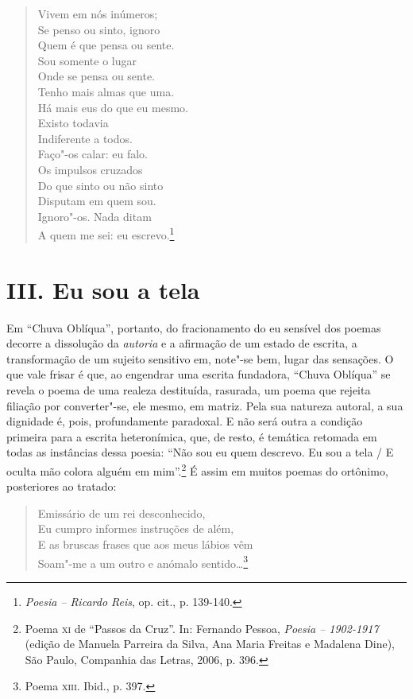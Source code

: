 \begin{verse}
Vivem em nós inúmeros;\\
Se penso ou sinto, ignoro\\
Quem é que pensa ou sente.\\
Sou somente o lugar\\
Onde se pensa ou sente.\\[5pt]
Tenho mais almas que uma.\\
Há mais eus do que eu mesmo.\\
Existo todavia\\
Indiferente a todos.\\
Faço"-os calar: eu falo.\\[5pt]
Os impulsos cruzados\\
Do que sinto ou não sinto\\
Disputam em quem sou.\\
Ignoro"-os. Nada ditam\\
A quem me sei: eu escrevo.\footnote{\emph{Poesia -- Ricardo Reis}, op.
  cit., p. 139-140.}
\end{verse}

\section*{III. Eu sou a tela}

Em ``Chuva Oblíqua'', portanto, do fracionamento do eu sensível dos
poemas decorre a dissolução da \emph{autoria} e a afirmação de um estado
de escrita, a transformação de um sujeito sensitivo em, note"-se bem,
lugar das sensações. O que vale frisar é que, ao engendrar uma escrita
fundadora, ``Chuva Oblíqua'' se revela o poema de uma realeza
destituída, rasurada, um poema que rejeita filiação por converter"-se,
ele mesmo, em matriz. Pela sua natureza autoral, a sua dignidade é,
pois, profundamente paradoxal. E não será outra a condição primeira para
a escrita heteronímica, que, de resto, é temática retomada em todas as
instâncias dessa poesia: ``Não sou eu quem descrevo. Eu sou a tela / E
oculta mão colora alguém em mim''.\footnote{Poema \textsc{xi} de
  ``Passos da Cruz''. In: Fernando Pessoa, \emph{Poesia -- 1902-1917}
  (edição de Manuela Parreira da Silva, Ana Maria Freitas e Madalena
  Dine), São Paulo, Companhia das Letras, 2006, p. 396.} É assim em
muitos poemas do ortônimo, posteriores ao tratado:

\begin{verse}
Emissário de um rei desconhecido,\\
Eu cumpro informes instruções de além,\\
E as bruscas frases que aos meus lábios vêm\\
Soam"-me a um outro e anómalo sentido\ldots{}\footnote{Poema \textsc{xiii}.
  Ibid., p. 397.}
\end{verse}

